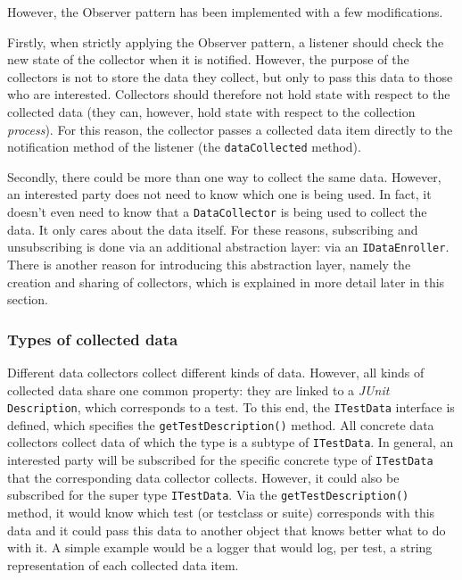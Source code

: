 \documentclass[i2]{oss}
\newcommand{\class}[1]{\texttt{#1}}
\newcommand{\method}[1]{\texttt{#1}}
\newcommand{\junit}{\emph{JUnit }}
\begin{document}
However, the Observer pattern has been implemented with a few modifications.

Firstly, when strictly applying the Observer pattern, a listener should check the new state of the collector when it is notified.
However, the purpose of the collectors is not to store the data they collect, but only to pass this data to those who are interested.
Collectors should therefore not hold state with respect to the collected data (they can, however, hold state with respect to the collection \emph{process}). 
For this reason, the collector passes a collected data item directly to the notification method of the listener (the \method{dataCollected} method).

Secondly, there could be more than one way to collect the same data.
However, an interested party does not need to know which one is being used.
In fact, it doesn't even need to know that a \class{DataCollector} is being used to collect the data.
It only cares about the data itself.
For these reasons, subscribing and unsubscribing is done via an additional abstraction layer: via an \class{IDataEnroller}.
There is another reason for introducing this abstraction layer, namely the creation and sharing of collectors, which is explained in more detail later in this section.

\subsubsection{Types of collected data}

Different data collectors collect different kinds of data.
However, all kinds of collected data share one common property: they are linked to a \junit \class{Description}, which corresponds to a test.
To this end, the \class{ITestData} interface is defined, which specifies the \method{getTestDescription()} method.
All concrete data collectors collect data of which the type is a subtype of \class{ITestData}.
In general, an interested party will be subscribed for the specific concrete type of \class{ITestData} that the corresponding data collector collects.
However, it could also be subscribed for the super type \class{ITestData}.
Via the \method{getTestDescription()} method, it would know which test (or testclass or suite) corresponds with this data and it could pass this data to another object that knows better what to do with it.
A simple example would be a logger that would log, per test, a string representation of each collected data item.
\end{document}
